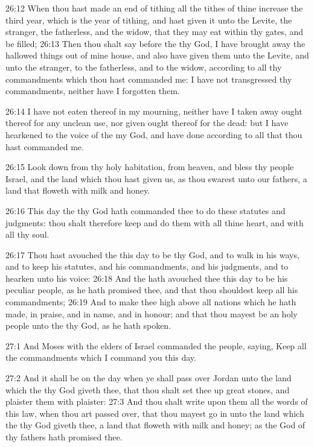 26:12 When thou hast made an end of tithing all the tithes of thine
increase the third year, which is the year of tithing, and hast given
it unto the Levite, the stranger, the fatherless, and the widow, that
they may eat within thy gates, and be filled; 26:13 Then thou shalt
say before the \LORD thy God, I have brought away the hallowed things
out of mine house, and also have given them unto the Levite, and unto
the stranger, to the fatherless, and to the widow, according to all
thy commandments which thou hast commanded me: I have not transgressed
thy commandments, neither have I forgotten them.

26:14 I have not eaten thereof in my mourning, neither have I taken
away ought thereof for any unclean use, nor given ought thereof for
the dead: but I have hearkened to the voice of the \LORD my God, and
have done according to all that thou hast commanded me.

26:15 Look down from thy holy habitation, from heaven, and bless thy
people Israel, and the land which thou hast given us, as thou swarest
unto our fathers, a land that floweth with milk and honey.

26:16 This day the \LORD thy God hath commanded thee to do these
statutes and judgments: thou shalt therefore keep and do them with all
thine heart, and with all thy soul.

26:17 Thou hast avouched the \LORD this day to be thy God, and to walk
in his ways, and to keep his statutes, and his commandments, and his
judgments, and to hearken unto his voice: 26:18 And the \LORD hath
avouched thee this day to be his peculiar people, as he hath promised
thee, and that thou shouldest keep all his commandments; 26:19 And to
make thee high above all nations which he hath made, in praise, and in
name, and in honour; and that thou mayest be an holy people unto the
\LORD thy God, as he hath spoken.

27:1 And Moses with the elders of Israel commanded the people, saying,
Keep all the commandments which I command you this day.

27:2 And it shall be on the day when ye shall pass over Jordan unto
the land which the \LORD thy God giveth thee, that thou shalt set thee
up great stones, and plaister them with plaister: 27:3 And thou shalt
write upon them all the words of this law, when thou art passed over,
that thou mayest go in unto the land which the \LORD thy God giveth
thee, a land that floweth with milk and honey; as the \LORD God of thy
fathers hath promised thee.

